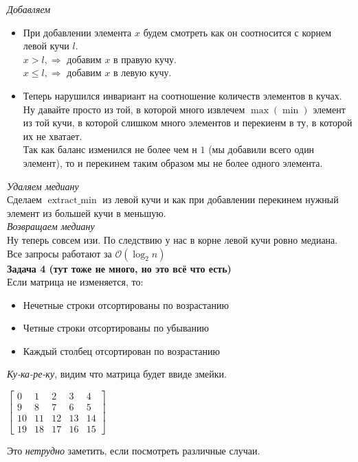 \documentclass[14pt,a4paper,report]{ncc}
\begin{document}
\textit{Добавляем}
\begin{itemize}
    \item {
        При добавлении элемента $x$ будем смотреть как он соотносится с корнем левой кучи $l$.\\
        $x > l, \Rightarrow$ добавим $x$ в правую кучу.\\
        $x \leq l, \Rightarrow$ добавим $x$ в левую кучу.\\

    }
    \item {
        Теперь нарушился инвариант на соотношение количеств элементов в кучах.
        Ну давайте просто из той, в которой много извлечем $\operatorname{max}(\operatorname{min})$ элемент из той кучи, в которой слишком много элементов и перекиенм в ту, в которой их не хватает.\\
        Так как баланс изменился не более чем н $1$ (мы добавили всего один элемент), то и перекинем таким образом мы не более одного элемента.
    }
\end{itemize}

\textit{Удаляем медиану}\\
Сделаем $\operatorname{extract\_min}$ из левой кучи и как при добавлении перекинем нужный элемент из большей кучи в меньшую.\\

\textit{Возвращаем медиану}\\
Ну теперь совсем изи. По следствию у нас в корне левой кучи ровно медиана.\\

Все запросы работают за $\mathcal{O}(\log_2{n})$\\

\textbf{Задача 4 (тут тоже не много, но это всё что есть)}\\
Если матрица не изменяется, то:
\begin{itemize}
    \item Нечетные строки отсортированы по возрастанию
    \item Четные строки отсортированы по убыванию
    \item Каждый столбец отсортирован по возрастанию
\end{itemize}
\textit{Ку-ка-ре-ку}, видим что матрица будет ввиде змейки.\\
\begin{center}
$
\begin{bmatrix}
0 & 1 & 2 & 3 & 4 \\
9 & 8 & 7 & 6 & 5 \\
10 & 11 & 12 & 13 & 14 \\
19 & 18 & 17 & 16 & 15
\end{bmatrix}
$\\
\end{center}
Это \textit{нетрудно} заметить, если посмотреть различные случаи.
\end{document}
